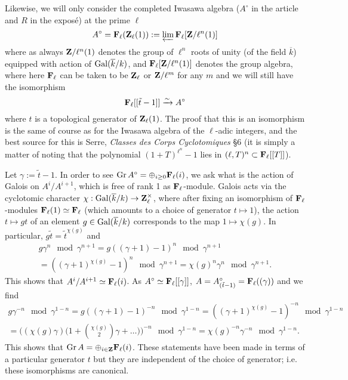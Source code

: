 \documentclass[deligne.tex]{subfiles}
\begin{document}
Likewise, we will only consider the completed Iwasawa algebra ($A^\circ$
in the article and $R$ in the exposé) at the prime $\ell$
\begin{equation*}
	A^\circ=\mathbf{F}_\ell(\mathbf{Z}_\ell(1)):=\varprojlim\mathbf{F}_\ell[\mathbf{Z}/\ell^n(1)]
\end{equation*}
where as always $\mathbf{Z}/\ell^n(1)$ denotes the group of $\ell^n$ roots of unity
(of the field $\overline k$) equipped with action of $\operatorname{Gal}(\overline k/k)$,
and $\mathbf{F}_\ell[\mathbf{Z}/\ell^n(1)]$ denotes the group algebra, where
here $\mathbf{F}_\ell$ can be taken to be $\mathbf{Z}_\ell$ or $\mathbf{Z}/\ell^m$ for any $m$ 
and we will still have the isomorphism
\begin{equation*}
	\mathbf{F}_\ell[[\tilde t-1]]\xrightarrow\sim A^\circ
\end{equation*}
where $t$ is a topological generator of $\mathbf{Z}_\ell(1)$.
The proof that this is an isomorphism is the same of course as for the
Iwasawa algebra of the $\ell$-adic integers, and the best source for this
is Serre, \emph{Classes des Corps Cyclotomiques} \S6
(it is simply a matter of noting that the polynomial $(1+T)^{\ell^n}-1$
lies in $(\ell,T)^n\subset\mathbf{F}_\ell[[T]]$).

Let $\gamma:=\tilde t-1$. In order to see
$\operatorname{Gr} A^\circ = \oplus_{i\geq0}\mathbf{F}_\ell(i)$, we ask what is the action of 
Galois on $A^i/A^{i+1}$, which is free of rank 1 as $\mathbf{F}_\ell$-module.
Galois acts via the cyclotomic character
$\chi:\operatorname{Gal}(\overline k/k)\rightarrow\mathbf{Z}_\ell^\times$, where after
fixing an isomorphism of $\mathbf{F}_\ell$-modules $\mathbf{F}_\ell(1)\simeq\mathbf{F}_\ell$
(which amounts to a choice of generator $t\mapsto 1$), the action
$t\mapsto gt$ of an element $g\in\operatorname{Gal}(\overline k/k)$ corresponds to the map 
$1\mapsto\chi(g)$. In particular, $g\tilde t=\tilde t^{\chi(g)}$ and
\begin{multline*}
	g \gamma^n\mod\gamma^{n+1}
	=g((\gamma+1)-1)^n\mod\gamma^{n+1} \\
	=((\gamma+1)^{\chi(g)}-1)^n\mod\gamma^{n+1}
	=\chi(g)^n\gamma^n\mod\gamma^{n+1}.
\end{multline*}
This shows that $A^i/A^{i+1}\simeq\mathbf{F}_\ell(i)$.
As $A^\circ\simeq\mathbf{F}_\ell[[\gamma]]$,
$A=A^\circ_{(\tilde t-1)}=\mathbf{F}_\ell((\gamma))$ and we find
\begin{multline*}
	g\gamma^{-n}\mod\gamma^{1-n}=g((\gamma+1)-1)^{-n}\mod\gamma^{1-n}
	=((\gamma+1)^{\chi(g)}-1)^{-n}\mod\gamma^{1-n} \\
	=\Big((\chi(g)\gamma)\Big(1+{\chi(g) \choose 2}\gamma+\ldots\Big)\Big)^{-n}\mod\gamma^{1-n}
	=\chi(g)^{-n}\gamma^{-n}\mod\gamma^{1-n}.
\end{multline*}
This shows that $\operatorname{Gr} A=\oplus_{i\in\mathbf{Z}}\mathbf{F}_\ell(i)$.
These statements have been made in terms of a particular generator $t$
but they are independent of the choice of generator; i.e. these isomorphisms
are canonical.
\end{document}
